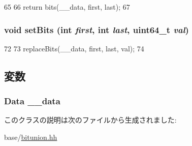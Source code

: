 \begin{DoxyCode}
65         {
66             return bits(__data, first, last);
67         }
\end{DoxyCode}
\hypertarget{classBitfieldBackend_1_1BitfieldBase_af6ec12098cdf09417b70364fa80c8d33}{
\subsubsection[{setBits}]{\setlength{\rightskip}{0pt plus 5cm}void setBits (int {\em first}, \/  int {\em last}, \/  uint64\_\-t {\em val})}}
\label{classBitfieldBackend_1_1BitfieldBase_af6ec12098cdf09417b70364fa80c8d33}



\begin{DoxyCode}
72         {
73             replaceBits(__data, first, last, val);
74         }
\end{DoxyCode}


\subsection{変数}
\hypertarget{classBitfieldBackend_1_1BitfieldBase_a839a29b43c94e265be8e77e13e74c923}{
\subsubsection[{\_\-\_\-data}]{\setlength{\rightskip}{0pt plus 5cm}Data {\bf \_\-\_\-data}}}
\label{classBitfieldBackend_1_1BitfieldBase_a839a29b43c94e265be8e77e13e74c923}


このクラスの説明は次のファイルから生成されました:\begin{DoxyCompactItemize}
\item 
base/\hyperlink{bitunion_8hh}{bitunion.hh}\end{DoxyCompactItemize}

